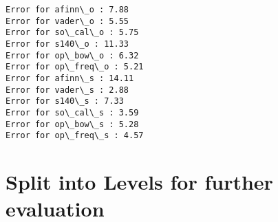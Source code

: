 \documentclass[11pt]{article}
\begin{document}
    \begin{Verbatim}[commandchars=\\\{\}]
Error for afinn\_o : 7.88
Error for vader\_o : 5.55
Error for so\_cal\_o : 5.75
Error for s140\_o : 11.33
Error for op\_bow\_o : 6.32
Error for op\_freq\_o : 5.21
Error for afinn\_s : 14.11
Error for vader\_s : 2.88
Error for s140\_s : 7.33
Error for so\_cal\_s : 3.59
Error for op\_bow\_s : 5.28
Error for op\_freq\_s : 4.57

    \end{Verbatim}

    \section{Split into Levels for further
evaluation}\label{split-into-levels-for-further-evaluation}
\end{document}
